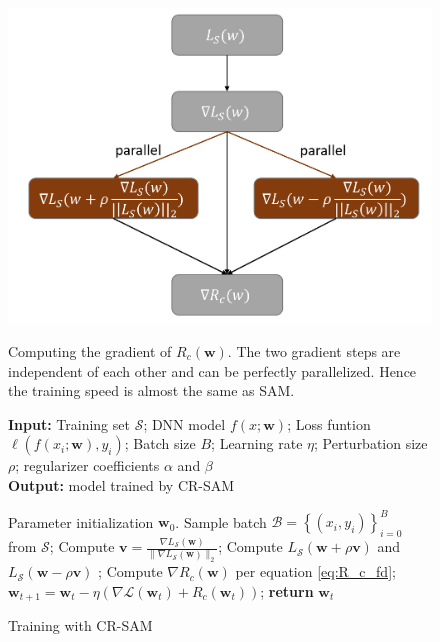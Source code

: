 \documentclass[letterpaper]{article} %
\theoremstyle{plain}
\theoremstyle{definition}
\begin{document}
\begin{figure}
\begin{minipage}{.45\textwidth}
\includegraphics[width=.9\textwidth]{figs/diagram.png}
\caption{Computing the gradient of $R_c(\boldsymbol{w})$. The two gradient steps are independent of each other and can be perfectly parallelized. Hence the training speed is almost the same as SAM.}
\label{fig:computation}
\end{minipage}
\hfill
\begin{minipage}{0.5\textwidth}
\begin{algorithm}[H]
\caption{Training with CR-SAM}
\label{alg:CR-SAM}
\begin{flushleft}
    \textbf{Input:} Training set $\mathcal{S}$; DNN model $f(x ; \boldsymbol{w})$; Loss funtion $\ell\left(f\left(x_i ; \boldsymbol{w}\right), y_i\right)$; Batch size $B$; Learning rate $\eta$; Perturbation size $\rho$; regularizer coefficients $\alpha$ and $\beta$ \\
    \textbf{Output:} model trained by CR-SAM
\end{flushleft}
\begin{algorithmic}[1]
    \State Parameter initialization $\boldsymbol{w}_0$.
        \State Sample batch $\mathcal{B}=\left\{\left({x}_i, {y}_i\right)\right\}_{i=0}^B$ from $\mathcal{S}$;
        \State Compute $\boldsymbol{v} = \frac{\nabla L_{\mathcal{S}}(\boldsymbol{w})}{\|\nabla L_{\mathcal{S}}(\boldsymbol{w})\|_2}$;
        \State Compute $L_{\mathcal{S}}(\boldsymbol{w}+\rho\boldsymbol{v})$ and $L_{\mathcal{S}}(\boldsymbol{w}-\rho\boldsymbol{v})$ ;
        \State Compute $\nabla R_c(\boldsymbol{w})$ per equation \ref{eq:R_c_fd};
        \State $\boldsymbol{w}_{t+1} = \boldsymbol{w}_t-\eta (\nabla\mathcal{L}\left(\boldsymbol{w}_t\right)+R_c\left(\boldsymbol{w}_t\right))$;
    \EndWhile
    \State \textbf{return} $\boldsymbol{w}_t$
\end{algorithmic}
\end{algorithm}
\end{minipage}
\vspace{-0.5cm}
\end{figure}
\end{document}
